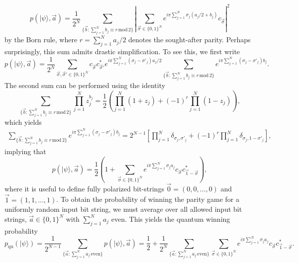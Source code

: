 \documentclass[prb,twocolumn,showpacs,amssymb,superscriptaddress]{revtex4-2}
\begin{document}
\begin{equation}
p(|\psi\rangle,\vec{a}) = \frac{1}{2^{N}} \sum_{\{\vec{b}:\sum_{j=1}^N b_j \equiv r \,\mathrm{mod} \,2\}} \left|  \sum_{\vec{\sigma} \in \{0,1\}^N} e^{i\pi \sum_{j=1}^N \sigma_j(a_j/2+b_j)} c_{\vec{\sigma}}\right|^2
\end{equation}
by the Born rule, where $r = \sum_{j=1}^N a_j/2$ denotes the sought-after parity. Perhaps surprisingly, this sum admits drastic simplification. To see this, we first write
\begin{equation}
p(|\psi\rangle,\vec{a}) = \frac{1}{2^{N}}  \sum_{\vec{\sigma},\vec{\sigma}' \in \{0,1\}^N} c_{\vec{\sigma}}c_{\vec{\sigma}'}^*e^{i\pi\sum_{j=1}^N (\sigma_j-\sigma'_j)a_j/2} \sum_{\{\vec{b}:\sum_{j=1}^N b_j \equiv r \,\mathrm{mod} \,2\}} e^{i\pi \sum_{j=1}^N (\sigma_j-\sigma'_j)b_j}. 
\end{equation}
The second sum can be performed using the identity
\begin{equation}
\label{identity}
\sum_{\{\vec{b}:\sum_{j=1}^N b_j \equiv r \,\mathrm{mod} \,2\}} \prod_{j=1}^N z_j^{b_j} = \frac{1}{2} \left( \prod_{j=1}^N (1+z_j) + (-1)^r  \prod_{j=1}^N (1-z_j)\right),
\end{equation}
which yields
\begin{align}
\sum_{\{\vec{b}:\sum_{j=1}^N b_j \equiv r \,\mathrm{mod} \,2\}} e^{i\pi \sum_{j=1}^N (\sigma_j-\sigma'_j)b_j} = 2^{N-1}\left[\prod_{j=1}^N \delta_{\sigma_j,\sigma'_j} + (-1)^r \prod_{j=1}^N \delta_{\sigma_j,1-\sigma'_j} \right],
\end{align}
implying that
\begin{equation}
p(|\psi\rangle,\vec{a}) = \frac{1}{2}\left(1+ \sum_{\vec{\sigma}\in \{0,1\}^N} e^{i\pi \sum_{j=1}^N \sigma_j a_j}c_{\vec{\sigma}}c^*_{\vec{1}-\vec{\sigma}}\right),
\end{equation}
where it is useful to define fully polarized bit-strings $\vec{0} = (0,0,\ldots,0)$ and $\vec{1} = (1,1,\ldots,1)$. To obtain the probability of winning the parity game for a uniformly random input bit string, we must average over all allowed input bit strings, $\vec{a} \in \{0,1\}^N$ with $\sum_{j=1}^N a_j$ even. This yields the quantum winning probability
\begin{equation}
p_{\mathrm{qu}}(|\psi\rangle)  = \frac{1}{2^{N-1}}\sum_{\{\vec{a}:\sum_{j=1}^N a_j \, \mathrm{even}\}} p(|\psi\rangle,\vec{a}) = \frac{1}{2} + \frac{1}{2^N} \sum_{\{\vec{a}:\sum_{j=1}^N a_j \, \mathrm{even}\}} \sum_{\vec{\sigma}\in \{0,1\}^N} e^{i\pi \sum_{j=1}^N \sigma_j a_j}c_{\vec{\sigma}}c^*_{\vec{1}-\vec{\sigma}}.
\end{equation}
\end{document}
